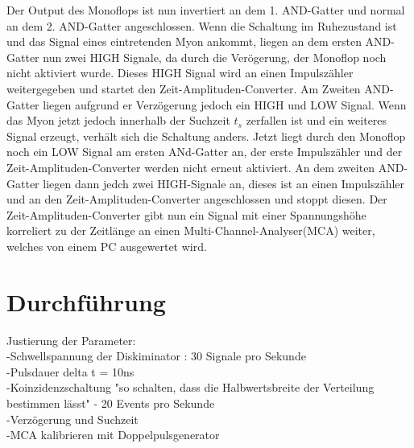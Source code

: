     Der Output des Monoflops ist nun invertiert an dem 1. AND-Gatter und normal an dem 2. AND-Gatter angeschlossen.
    Wenn die Schaltung im Ruhezustand ist und das Signal eines eintretenden Myon ankommt, liegen an dem ersten AND-Gatter nun zwei HIGH Signale, da durch die Verögerung, der Monoflop noch nicht aktiviert wurde.
    Dieses HIGH Signal wird an einen Impulszähler weitergegeben und startet den Zeit-Amplituden-Converter.
    Am Zweiten AND-Gatter liegen aufgrund er Verzögerung jedoch ein HIGH und LOW Signal.
    Wenn das Myon jetzt jedoch innerhalb der Suchzeit $t_s$ zerfallen ist und ein weiteres Signal erzeugt, verhält sich die Schaltung anders.
    Jetzt liegt durch den Monoflop noch ein LOW Signal am ersten ANd-Gatter an, der erste Impulszähler und der Zeit-Amplituden-Converter werden nicht erneut aktiviert.
    An dem zweiten AND-Gatter liegen dann jedch zwei HIGH-Signale an, dieses ist an einen Impulszähler und an den Zeit-Amplituden-Converter angeschlossen und stoppt diesen.
    Der Zeit-Amplituden-Converter gibt nun ein Signal mit einer Spannungshöhe korreliert zu der Zeitlänge an einen Multi-Channel-Analyser(MCA) weiter, welches von einem PC ausgewertet wird.

\section{Durchführung}

    Justierung der Parameter:\\
    -Schwellspannung der Diskiminator : 30 Signale pro Sekunde\\
    -Pulsdauer delta t = 10ns\\
    -Koinzidenzschaltung "so schalten, dass die Halbwertsbreite der Verteilung bestimmen lässt" - 20 Events pro Sekunde\\
    -Verzögerung und Suchzeit \\
    -MCA kalibrieren mit Doppelpulsgenerator\\